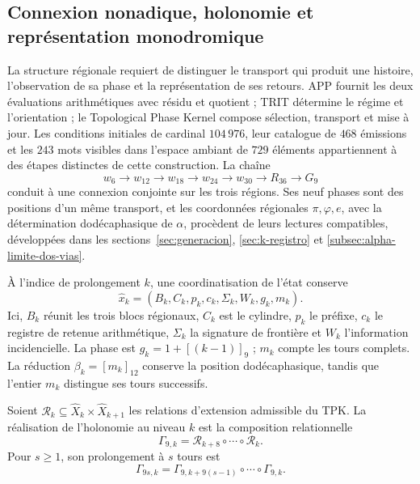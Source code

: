 \subsection{Connexion nonadique, holonomie et représentation monodromique}
\label{mono-ampl:conexion}

La structure régionale requiert de distinguer le transport qui produit une
histoire, l'observation de sa phase et la représentation de ses retours.
APP fournit les deux évaluations arithmétiques avec résidu et quotient ; TRIT
détermine le régime et l'orientation ; le Topological Phase Kernel compose
sélection, transport et mise à jour. Les conditions initiales de
cardinal \(104\,976\), leur catalogue de \(468\) émissions et les \(243\)
mots visibles dans l'espace ambiant de \(729\) éléments appartiennent à des étapes
distinctes de cette construction. La chaîne
\[
 w_6\longrightarrow w_{12}\longrightarrow w_{18}
 \longrightarrow w_{24}\longrightarrow w_{30}
 \longrightarrow R_{36}\longrightarrow G_9
\]
conduit à une connexion conjointe sur les trois régions. Ses neuf phases
sont des positions d’un même transport, et les coordonnées régionales
\(\pi,\varphi,e\), avec la détermination dodécaphasique de \(\alpha\),
procèdent de leurs lectures compatibles, développées dans les
sections~\ref{sec:generacion}, \ref{sec:k-registro} et
\ref{subsec:alpha-limite-dos-vias}.

À l'indice de prolongement \(k\), une coordinatisation de l'état conserve
\[
 \widehat x_k=(B_k,C_k,p_k,c_k,\Sigma_k,W_k,g_k,m_k).
\]
Ici, \(B_k\) réunit les trois blocs régionaux, \(C_k\) est le cylindre,
\(p_k\) le préfixe, \(c_k\) le registre de retenue arithmétique, \(\Sigma_k\) la signature
de frontière et \(W_k\) l'information incidencielle. La phase est
\(g_k=1+[(k-1)]_9\) ; \(m_k\) compte les tours complets. La réduction
\(\beta_k=[m_k]_{12}\) conserve la position dodécaphasique, tandis que
l'entier \(m_k\) distingue ses tours successifs.

\begin{definition}
\label{mono-ampl:def-vuelta}
Soient \(\mathcal R_k\subseteq\widehat X_k\times\widehat X_{k+1}\)
les relations d'extension admissible du TPK. La réalisation de
l'holonomie au niveau \(k\) est la composition relationnelle
\[
 \Gamma_{9,k}=\mathcal R_{k+8}\circ\cdots\circ\mathcal R_k.
\]
Pour \(s\geq1\), son prolongement à \(s\) tours est
\[
 \Gamma_{9s,k}=
 \Gamma_{9,k+9(s-1)}\circ\cdots\circ\Gamma_{9,k}.
\]
\end{definition}

